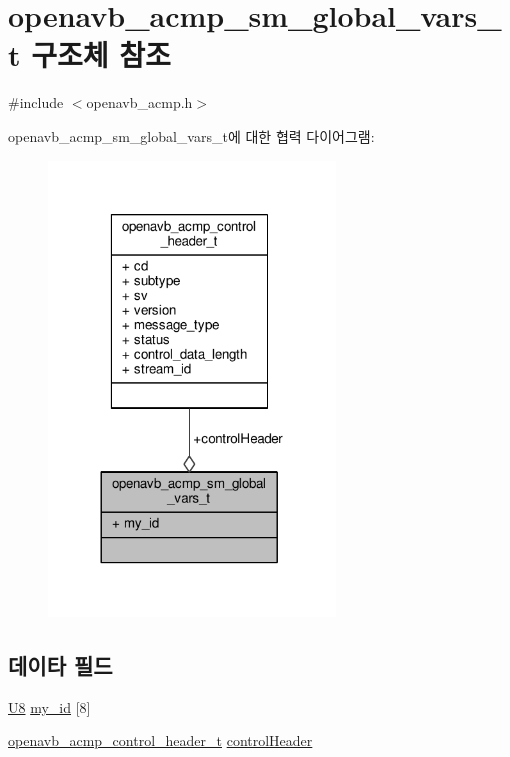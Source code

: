 \hypertarget{structopenavb__acmp__sm__global__vars__t}{}\section{openavb\+\_\+acmp\+\_\+sm\+\_\+global\+\_\+vars\+\_\+t 구조체 참조}
\label{structopenavb__acmp__sm__global__vars__t}


{\ttfamily \#include $<$openavb\+\_\+acmp.\+h$>$}



openavb\+\_\+acmp\+\_\+sm\+\_\+global\+\_\+vars\+\_\+t에 대한 협력 다이어그램\+:
\nopagebreak
\begin{figure}[H]
\begin{center}
\leavevmode
\includegraphics[width=216pt]{structopenavb__acmp__sm__global__vars__t__coll__graph}
\end{center}
\end{figure}
\subsection*{데이타 필드}
\begin{DoxyCompactItemize}
\item 
\hyperlink{openavb__types__base__pub_8h_aa63ef7b996d5487ce35a5a66601f3e73}{U8} \hyperlink{structopenavb__acmp__sm__global__vars__t_abea1c7f5c4a2c027508c48e6e2880bd5}{my\+\_\+id} \mbox{[}8\mbox{]}
\item 
\hyperlink{structopenavb__acmp__control__header__t}{openavb\+\_\+acmp\+\_\+control\+\_\+header\+\_\+t} \hyperlink{structopenavb__acmp__sm__global__vars__t_ab8b927414a6fac6fb2c845292107825b}{control\+Header}
\end{DoxyCompactItemize}


